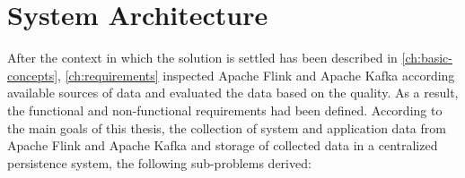\chapter{System Architecture}
\label{ch:architecture}


After the context in which the solution is settled has been described in \autoref{ch:basic-concepts}, \autoref{ch:requirements}
inspected Apache Flink and Apache Kafka according available sources of data and evaluated the data based on the quality. As
a result, the functional and non-functional requirements had been defined.  According to the main goals of this thesis,
the collection of system and application data from Apache Flink and Apache Kafka and storage of collected data in a
centralized persistence system, the following sub-problems derived:

